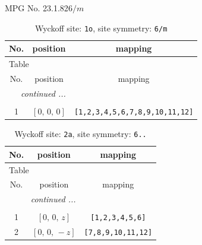 \documentclass[fleqn,8pt]{jsarticle}
\begin{document}
\setcounter{MaxMatrixCols}{32}

\renewcommand{\tablename}{Table~}
\renewcommand{\figurename}{Figure~}
\begin{center}
\LARGE
MPG No. 23.1.82\quad$6/m$
\end{center}
\renewcommand{\arraystretch}{1.2}
\begin{longtable}{ccc}
\caption{Wyckoff site: {\tt 1o}, site symmetry: {\tt 6/m}}
 \\
 \hline \hline
No. & position & mapping \\ \hline \endfirsthead

\multicolumn{2}{l}{\tablename\ \thetable{}} \\
 \hline \hline
No. & position & mapping \\ \hline \endhead

 \hline \hline
\multicolumn{2}{r}{\footnotesize\it continued ...} \\ \endfoot

 \hline \hline
\multicolumn{2}{r}{} \\ \endlastfoot

1 & $\left[ 0,\, 0,\, 0 \right]$ & {\tt [1,2,3,4,5,6,7,8,9,10,11,12]} \\
\end{longtable}
\renewcommand{\arraystretch}{1.2}
\begin{longtable}{ccc}
\caption{Wyckoff site: {\tt 2a}, site symmetry: {\tt 6..}}
 \\
 \hline \hline
No. & position & mapping \\ \hline \endfirsthead

\multicolumn{2}{l}{\tablename\ \thetable{}} \\
 \hline \hline
No. & position & mapping \\ \hline \endhead

 \hline \hline
\multicolumn{2}{r}{\footnotesize\it continued ...} \\ \endfoot

 \hline \hline
\multicolumn{2}{r}{} \\ \endlastfoot

1 & $\left[ 0,\, 0,\, z \right]$ & {\tt [1,2,3,4,5,6]} \\ \hline
2 & $\left[ 0,\, 0,\, - z \right]$ & {\tt [7,8,9,10,11,12]} \\
\end{longtable}
\renewcommand{\arraystretch}{1.2}
\end{document}
